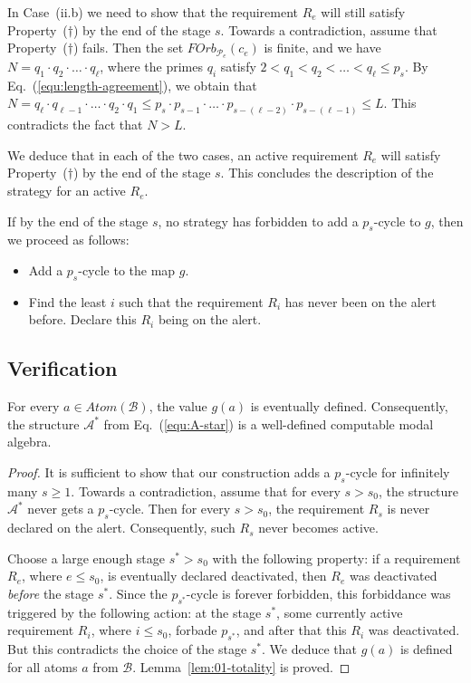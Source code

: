 \documentclass[a4paper,UKenglish,cleveref, autoref, thm-restate]{lipics-v2021}
\begin{document}
In Case~(ii.b) we need to show that the requirement $R_e$ will still satisfy Property~($\dagger$) by the end of the stage $s$. Towards a contradiction, assume that Property~($\dagger$) fails. Then the set $FOrb_{\mathcal{P}_e}(c_e)$ is finite, and we have $N = q_1 \cdot q_2\cdot \ldots \cdot q_{\ell}$, where the primes $q_i$ satisfy $2 < q_1 < q_2 <\dots <q_\ell \leq p_s$. By Eq.~(\ref{equ:length-agreement}), we obtain that
$
	N = q_{\ell} \cdot q_{\ell-1} \cdot \ldots \cdot  q_2\cdot q_1 \leq p_s \cdot p_{s-1} \cdot \ldots \cdot p_{s-(\ell-2)} \cdot p_{s-(\ell-1)} \leq L.
$
This contradicts the fact that $N > L$. 

We deduce that in each of the two cases, an active requirement $R_e$ will satisfy Property~($\dagger$) by the end of the stage $s$. This concludes the description of the strategy for an active $R_e$.



If by the end of the stage $s$, no strategy has forbidden to add a $p_s$-cycle to $g$, then we proceed as follows:
\begin{itemize}
	\item Add a $p_s$-cycle to the map $g$.
	
	\item Find the least $i$ such that the requirement $R_i$ has never been on the alert before. Declare this $R_i$ being on the alert.
\end{itemize}






\subsection{Verification}

\begin{lemma}\label{lem:01-totality}
	For every $a\in Atom(\mathcal{B})$, the value $g(a)$ is eventually defined. Consequently, the structure $\mathcal{A}^{\ast}$ from Eq.~(\ref{equ:A-star}) is a well-defined computable modal algebra.
\end{lemma}
\begin{proof}
	It is sufficient to show that our construction adds a $p_s$-cycle for infinitely many $s\geq 1$. Towards a contradiction, assume that for every $s> s_0$, the structure $\mathcal{A}^{\ast}$ never gets a $p_s$-cycle. Then for every $s>s_0$, the requirement $R_s$ is never declared on the alert. Consequently, such $R_s$ never becomes active.

	Choose a large enough stage $s^{\ast} > s_0$ with the following property: if a requirement $R_e$, where $e\leq s_0$, is eventually declared deactivated, then $R_e$ was deactivated \emph{before} the stage $s^{\ast}$. Since the $p_{s^{\ast}}$-cycle is forever forbidden, this forbiddance was triggered by the following action: at the stage $s^{\ast}$, some currently active requirement $R_i$, where $i\leq s_0$, forbade $p_{s^{\ast}}$, and after that this $R_i$ was deactivated. But this contradicts the choice of the stage $s^{\ast}$. 
	We deduce that $g(a)$ is defined for all atoms $a$ from $\mathcal{B}$. Lemma~\ref{lem:01-totality} is proved.
\end{proof}
\end{document}
